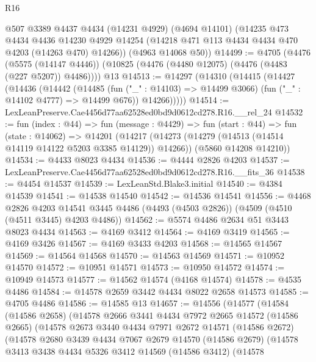 \begin{lexlean}{R16}
\begin{coremodule}
      @507
      @3389
      @4437
      @4434
      (@14231 @4929)
      (@4694 @14101)
      (@14235
        @473
        @4434
        @4436
        @14230
        @4929
        @14254
        (@14218 @471 @113 @4434 @4434 @470 @4203 (@14263 @470) @14266))
      (@4963 @14068 @50))
@14499 := @4705
    (@4476
      (@5575 (@14147 @4446))
      (@10825 (@4476 (@4480 @12075) (@4476 (@4483 (@227 @5207)) @4486))))
    @13
@14513 := @14297
    (@14310
      (@14415
        (@14427
          (@14436
            (@14442
              (@14485
                (fun ("_" : @14103) => @14499 @3066)
                (fun ("_" : @14102 @4777) => @14499 @676))
              @14266)))))
@14514 := LexLeanPreserve.Cae4456d77aa62528ed0bd9d0612cd278.R16.__rel_24
@14532 := fun (index : @44) =>
  fun (message : @4429) =>
  fun (start : @44) =>
  fun (state : @14062) =>
  @14201
    (@14217
      (@14273 (@14279 (@14513 (@14514 @14119 @14122 @5203 @3385 @14129)) @14266))
      (@5860 @14208 @14210))
@14534 := @4433 @8023 @4434
@14536 := @4444 @2826 @4203
@14537 := LexLeanPreserve.Cae4456d77aa62528ed0bd9d0612cd278.R16.__fits_36
@14538 := @4454 @14537
@14539 := LexLeanStd.Blake3.initial
@14540 := @4384 @14539
@14541 := @14538 @14540
@14542 := @14536 @14541
@14556 := @4468
    @2826
    @4203
    @14541
    @3445
    @4486
    (@4493 (@4503 @2826))
    (@4509 (@4510 (@4511 @3445) @4203 @4486))
@14562 := @5574 @4486 @2634 @51 @3443 @8023 @4434
@14563 := @4169 @3412
@14564 := @4169 @3419
@14565 := @4169 @3426
@14567 := @4169 @3433 @4203
@14568 := @14565 @14567
@14569 := @14564 @14568
@14570 := @14563 @14569
@14571 := @10952 @14570
@14572 := @10951 @14571
@14573 := @10950 @14572
@14574 := @10949 @14573
@14577 := @14562 @14574 (@4168 @14574)
@14578 := @4535 @4486
@14584 := @14578 @2659 @3442 @4434 @8022 @2658 @14573
@14585 := @4705 @4486
@14586 := @14585 @13
@14657 := @14556
    (@14577
      (@14584
        (@14586 @2658)
        (@14578
          @2666
          @3441
          @4434
          @7972
          @2665
          @14572
          (@14586 @2665)
          (@14578
            @2673
            @3440
            @4434
            @7971
            @2672
            @14571
            (@14586 @2672)
            (@14578
              @2680
              @3439
              @4434
              @7067
              @2679
              @14570
              (@14586 @2679)
              (@14578
                @3413
                @3438
                @4434
                @5326
                @3412
                @14569
                (@14586 @3412)
                (@14578

\end{coremodule}
\end{lexlean}
